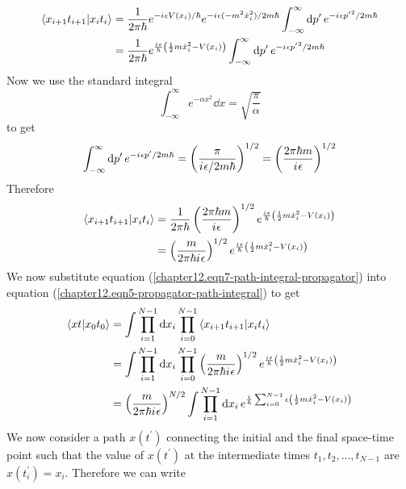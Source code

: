 \begin{enumerate}
	\begin{align}
		\braket{x_{i+1} t_{i+1}}{x_i t_i} 
		&= \frac{1}{2 \pi \hbar} e^{-{i\mkern1mu} \epsilon V(x_i)/\hbar} e^{-{i\mkern1mu} \epsilon (-m^2 \dot{x}_i^2) / 2 m \hbar}  \int_{-\infty}^{\infty} \dd{p^\prime} e^{-{i\mkern1mu} \epsilon {p^\prime}^2 / 2 m \hbar} \\
		&= \frac{1}{2 \pi \hbar} e^{\frac{{i\mkern1mu} \epsilon}{\hbar} \left(\frac{1}{2} m \dot{x}_i^2 - V(x_i)\right)} \int_{-\infty}^{\infty} \dd{p^\prime} e^{-{i\mkern1mu} \epsilon {p^\prime}^2 / 2 m \hbar}
	\end{align}
	Now we use the standard integral
	\begin{equation}
		\int_{-\infty}^{\infty} e^{-\alpha x^2} \dd{x} = \sqrt{\frac{\pi}{\alpha}}
	\end{equation}
	to get
	\begin{equation}
		\int_{-\infty}^{\infty} \dd{p^\prime} e^{-{i\mkern1mu} \epsilon p^\prime / 2 m \hbar} = \left(\frac{\pi}{{i\mkern1mu} \epsilon/2 m \hbar}\right)^{1/2} = \left(\frac{2 \pi \hbar m}{{i\mkern1mu} \epsilon}\right)^{1/2}
	\end{equation}
	Therefore
	\begin{align}
		\braket{x_{i+1} t_{i+1}}{x_i t_i} 
		&= \frac{1}{2 \pi \hbar} \left(\frac{2 \pi \hbar m}{{i\mkern1mu} \epsilon}\right)^{1/2} e^{\frac{{i\mkern1mu} \epsilon}{\hbar} \left(\frac{1}{2} m \dot{x}_i^2 - V(x_i)\right)} \\
		&= \left(\frac{m}{2\pi\hbar{i\mkern1mu} \epsilon}\right)^{1/2} e^{\frac{{i\mkern1mu} \epsilon}{\hbar} \left(\frac{1}{2} m \dot{x}_i^2 - V(x_i)\right)}
		\label{chapter12.eqn7-path-integral-propagator}
	\end{align}
	We now substitute equation (\ref{chapter12.eqn7-path-integral-propagator}) into equation (\ref{chapter12.eqn5-propagator-path-integral}) to get
	\begin{align}
		\braket{x t}{x_0 t_0} 
		&= \int \prod_{i=1}^{N-1} \dd{x_i} \prod_{i=0}^{N-1} \braket{x_{i+1} t_{i+1}}{x_i t_i}\\
		&= \int \prod_{i=1}^{N-1} \dd{x_i} \prod_{i=0}^{N-1} \left(\frac{m}{2 \pi \hbar {i\mkern1mu} \epsilon}\right)^{1/2} e^{\frac{{i\mkern1mu} \epsilon}{\hbar} \left(\frac{1}{2} m \dot{x}_i^2 - V(x_i)\right)} \\
		&= \left(\frac{m}{2 \pi \hbar {i\mkern1mu} \epsilon}\right)^{N/2} \int \prod_{i=1}^{N-1} \dd{x_i}e^{\frac{{i\mkern1mu}}{\hbar} \sum_{i=0}^{N-1} \epsilon \left(\frac{1}{2} m \dot{x}_i^2 - V(x_i)\right)}
		\label{chapter12.eqn8-path-integral-propagator}
	\end{align}
	We now consider a path $x(t^\prime)$ connecting the initial and the final space-time point such that the value of $x(t^\prime)$ at the intermediate times $t_1, t_2, \ldots, t_{N-1}$ are $x(t_i^\prime)=x_i$. Therefore we can write

\end{enumerate}
